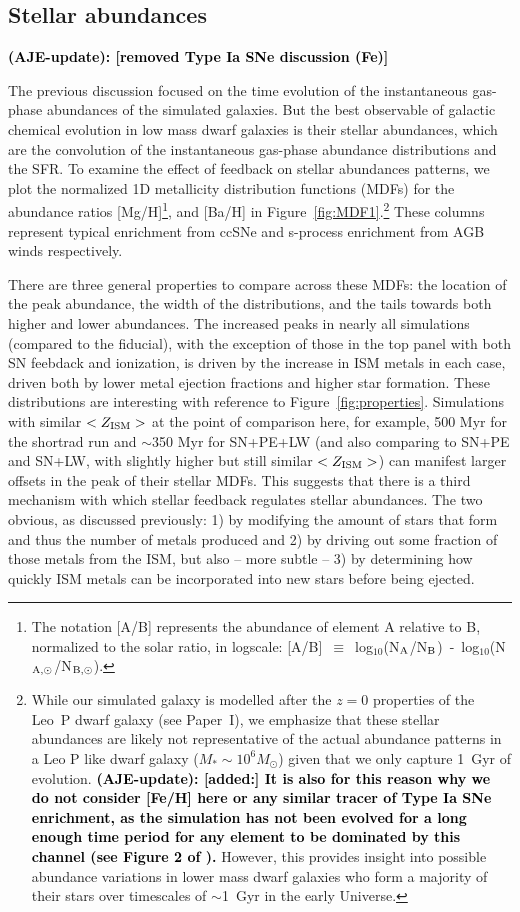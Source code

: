 \documentclass[twocolumn]{aastex62}
\newcommand{\changed}[1]{\textcolor{black}{\textbf{(AJE-update): #1}}}
\begin{document}
\subsection{Stellar abundances}
\label{sec:stellar abundances}

\changed{[removed Type Ia SNe discussion (Fe)]}

The previous discussion focused on the time evolution of the instantaneous gas-phase abundances of the simulated galaxies. But the best observable of galactic chemical evolution in low mass dwarf galaxies is their stellar abundances, which are the convolution of the instantaneous gas-phase abundance distributions and the SFR. To examine the effect of feedback on stellar abundances patterns, we plot the normalized 1D metallicity distribution functions (MDFs) for the abundance ratios [Mg/H]\footnote{The notation [A/B] represents the abundance of element A relative to B, normalized to the solar ratio, in logscale: [A/B]~$\equiv$~log$_{10}$(N$_{\rm A}$/N$_{\rm B}$)~-~log$_{10}$(N$_{\rm A,\odot}$/N$_{\rm B,\odot}$).}, and [Ba/H] in Figure~\ref{fig:MDF1}.\footnote{ While our simulated galaxy is modelled after the $z=0$ properties of the Leo~P dwarf galaxy (see Paper~I), we emphasize that these stellar abundances are likely not representative of the actual abundance patterns in a Leo P like dwarf galaxy ($M_* \sim 10^6 M_{\odot}$) given that we only capture 1~Gyr of evolution. \changed{[added:] It is also for this reason why we do not consider [Fe/H] here or any similar tracer of Type Ia SNe enrichment, as the simulation has not been evolved for a long enough time period for any element to be dominated by this channel (see Figure 2 of \citet{Emerick2018b}).} However, this provides insight into possible abundance variations in lower mass dwarf galaxies who form a majority of their stars over timescales of $\sim$1~Gyr in the early Universe.} These columns represent typical enrichment from ccSNe and s-process enrichment from AGB winds respectively. 

There are three general properties to compare across these MDFs: the location of the peak abundance, the width of the distributions, and the tails towards both higher and lower abundances. The increased peaks in nearly all simulations (compared to the fiducial), with the exception of those in the top panel with both SN feebdack and ionization, is driven by the increase in ISM metals in each case, driven both by lower metal ejection fractions and higher star formation. These distributions are interesting with reference to Figure~\ref{fig:properties}. Simulations with similar $<Z_{\rm ISM}>$ at the point of comparison here, for example, 500 Myr for the shortrad run and $\sim$350 Myr for SN+PE+LW (and also comparing to SN+PE and SN+LW, with slightly higher but still similar $<Z_{\rm ISM}>$) can manifest larger offsets in the peak of their stellar MDFs. This suggests that there is a third mechanism with which stellar feedback regulates stellar abundances. The two obvious, as discussed previously: 1) by modifying the amount of stars that form and thus the number of metals produced and 2) by driving out some fraction of those metals from the ISM, but also  -- more subtle -- 3) by determining how quickly ISM metals can be incorporated into new stars before being ejected. 
\end{document}
